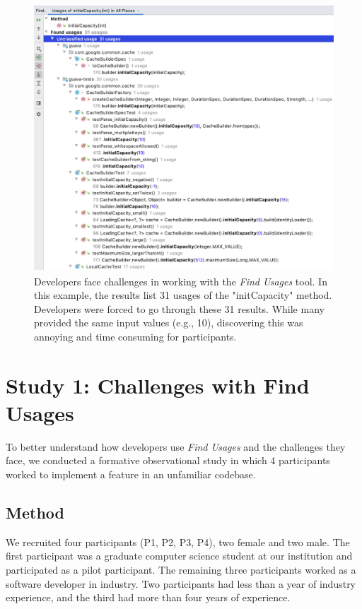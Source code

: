 \documentclass[conference]{IEEEtran}
\begin{document}
\begin{figure}[h]
    \centering
    \includegraphics [width=15cm,height=10cm,keepaspectratio,clip]{figures/challenge}
    \caption{Developers face challenges in working with the \textit{Find Usages} tool. In this example, the results list 31 usages of the "initCapacity" method. Developers were forced to go through these 31 results. 
    While many provided the same input values (e.g., 10), discovering this was annoying and time consuming for participants. 
}
\label{fig:usege}
\end{figure}
\section{Study 1: Challenges with Find Usages}

To better understand how developers use \textit{Find Usages} and the challenges they face, we conducted a formative observational study in which 4 participants worked to implement a feature in an unfamiliar codebase.

\subsection{Method}
We recruited four participants (P1, P2, P3, P4), two female and two male. The first participant was a graduate computer science student at our institution and participated as a pilot participant. The remaining three participants worked as a software developer in industry. Two participants had less than a year of industry experience, and the third had more than four years of experience.\par 
\end{document}
